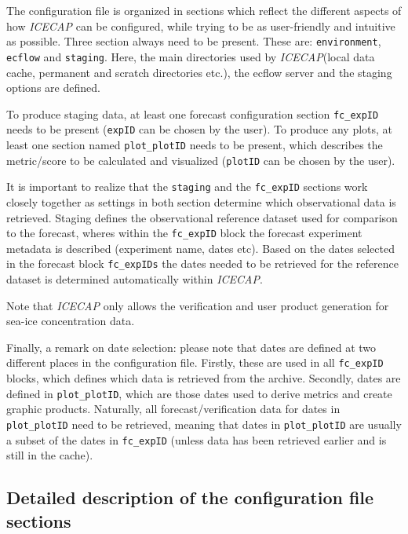 \documentclass[DIV=10, parskip=full]{scrreprt}
\newcommand{\ice}{\textit{ICECAP}\xspace}
\begin{document}
The configuration file is organized in sections which reflect the different aspects of how \ice can be configured, while trying to be as user-friendly and intuitive as possible. Three section always need to be present. These are: \texttt{environment}, \texttt{ecflow} and \texttt{staging}. Here, the main directories used by \ice (local data cache, permanent and scratch directories etc.), the ecflow server and the staging options are defined. 


To produce staging data, at least one forecast configuration section \texttt{fc\_expID} needs to be present (\texttt{expID} can be chosen by the user). To produce any plots, at least one section named \texttt{plot\_plotID} needs to be present, which describes the metric/score to be calculated and visualized (\texttt{plotID} can be chosen by the user). 

It is important to realize that the \texttt{staging} and the \texttt{fc\_expID} sections work closely together as settings in both section determine which observational data is retrieved. Staging defines the observational reference dataset used for comparison to the forecast, wheres within the \texttt{fc\_expID} block the forecast experiment metadata is described (experiment name, dates etc). Based on the dates selected in the forecast block \texttt{fc\_expIDs} the dates needed to be retrieved for the reference dataset is determined automatically within \ice.

Note that \ice only allows the verification and user product generation for sea-ice concentration data.


Finally, a remark on date selection: please note that dates are defined at two different places in the configuration file. Firstly, these are used in all \texttt{fc\_expID} blocks, which defines which data is retrieved from the archive. Secondly, dates are defined in \texttt{plot\_plotID}, which are those dates used to derive metrics and create graphic products. Naturally, all forecast/verification data for dates in \texttt{plot\_plotID} need to be retrieved, meaning that dates in \texttt{plot\_plotID} are usually a subset of the dates in \texttt{fc\_expID} (unless data has been retrieved earlier and is still in the cache).

\subsection{Detailed description of the configuration file sections}
\end{document}
